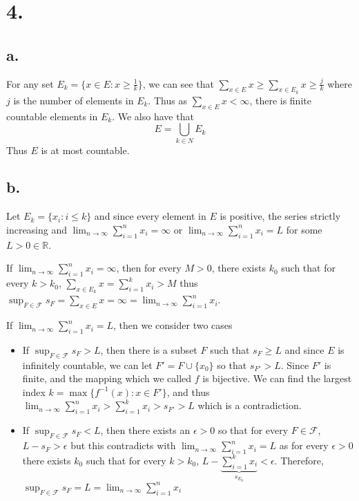 \documentclass[11pt]{article}
\theoremstyle{mystyle}
\theoremstyle{definition}
\begin{document}
\section*{4.}
\subsection*{a.}
For any set $E_k = \{x \in E: x \ge \frac{1}{k} \}$, we can see that $\sum_{x \in E}x \ge \sum_{x \in E_k} x \ge \frac{j}{k}$ where $j$ is the number of elements in $E_k$. Thus as $\sum_{x \in E} x < \infty$, there is finite countable elements in $E_k$. We also have that 
\[
  E = \bigcup_{k \in N} E_k
\]
Thus $E$ is at most countable.
\subsection*{b.}
Let $E_k = \{x_i: i \le k\}$ and since every element in $E$ is positive, the series strictly increasing and $\lim_{n \to \infty} \sum_{i=1}^n x_i = \infty$ or $\lim_{n \to \infty} \sum_{i=1}^n x_i = L$ for some $L >0 \in \mathbb{R}$. 

If $\lim_{n \to \infty} \sum_{i=1}^n x_i = \infty$, then for every $M > 0$, there exists $k_0$ such that for every $k>k_0$, $\sum_{x \in E_k} x= \sum_{i=1}^k x_i > M$ thus $\sup_{F \in \mathcal{F}} s_F = \sum_{x \in E} x = \infty = \lim_{n \to \infty} \sum_{i=1}^n x_i$.

If $\lim_{n \to \infty} \sum_{i=1}^n x_i = L$, then we consider two cases 
\begin{itemize}
  \item If $\sup_{F \in \mathcal{F}} s_F > L$, then there is a subset $F$ such that $s_F \ge L$ and since $E$ is infinitely countable, we can let $F' = F \cup \{x_0\}$ so that $s_{F'} > L$. Since $F'$ is finite, and the mapping which we called $f$ is bijective. We can find the largest index $k = \max\{f^{-1}(x): x \in F' \}$, and thus $\lim_{n \to \infty} \sum_{i=1}^n x_i > \sum_{i=1}^k x_i > s_{F'} > L$ which is a contradiction.
  \item If $\sup_{F \in \mathcal{F}} s_F < L$, then there exists an $\epsilon >0$ so that for every $F \in \mathcal{F}$, $L - s_F > \epsilon$ but this contradicts with $\lim_{n\to \infty} \sum_{i=1}^n x_i = L$ as for every $\epsilon >0$ there exists $k_0$ such that for every $k>k_0$, $L - \underbrace{\sum_{i=1}^k x_i}_{s_{E_k}}< \epsilon$. 
    Therefore, $\sup_{F \in \mathcal{F}} s_F = L = \lim_{n \to \infty} \sum_{i=1}^n x_i$
\end{itemize}
\end{document}
